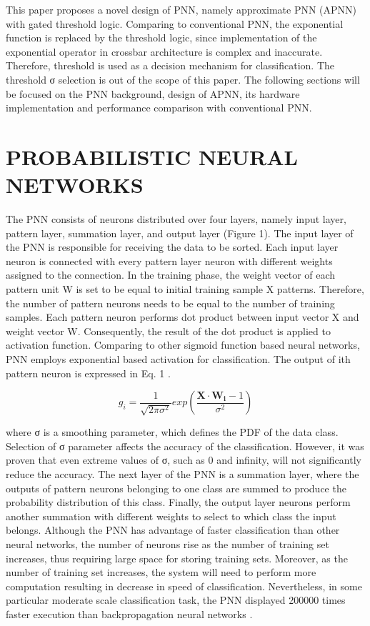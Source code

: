 \documentclass[sigconf]{acmart}
\begin{document}
This paper proposes a novel design of PNN, namely approximate PNN (APNN) with gated threshold logic. Comparing to conventional PNN, the exponential function is replaced by the threshold logic, since implementation of the exponential operator in crossbar architecture is complex and inaccurate. Therefore, threshold is used as a decision mechanism for classification. The threshold σ selection is out of the scope of this paper. The following sections will be focused on the PNN background, design of APNN, its hardware implementation and performance comparison with conventional PNN.

\section{PROBABILISTIC NEURAL NETWORKS}
The PNN consists of neurons distributed over four layers, namely input layer, pattern layer, summation layer, and output layer (Figure 1). The input layer of the PNN is responsible for receiving the data to be sorted. Each input layer neuron is connected with every pattern layer neuron with different weights assigned to the connection. In the training phase, the weight vector of each pattern unit W is set to be equal to initial training sample X patterns. Therefore, the number of pattern neurons needs to be equal to the number of training samples. Each pattern neuron performs dot product between input vector X and weight vector W. Consequently, the result of the dot product is applied to activation function. Comparing to other sigmoid function based neural networks, PNN employs exponential based activation for classification. The output of ith pattern neuron is expressed in Eq. 1 \cite{specht1988probabilistic}.

\begin{equation}
g_{i}=\frac{1}{\sqrt{2\pi\sigma^{2}}}exp\left(\frac{\boldsymbol{X\cdot W_{i}}-1}{\sigma^{2}}\right)
\end{equation}


where σ is a smoothing parameter, which defines the PDF of the data class. Selection of σ parameter affects the accuracy of the classification. However, it was proven that even extreme values of σ, such as 0 and infinity, will not significantly reduce the accuracy. The next layer of the PNN is a summation layer, where the outputs of pattern neurons belonging to one class are summed to produce the probability distribution of this class. Finally, the output layer neurons perform another summation with different weights to select to which class the input belongs. Although the PNN has advantage of faster classification than other neural networks, the number of neurons rise as the number of training set increases, thus requiring large space for storing training sets. Moreover, as the number of training set increases, the system will need to perform more computation resulting in decrease in speed of classification. Nevertheless, in some particular moderate scale classification task, the PNN displayed 200000 times faster execution than backpropagation neural networks \cite{specht1990probabilistic}. 

\section{}



 
\end{document}
